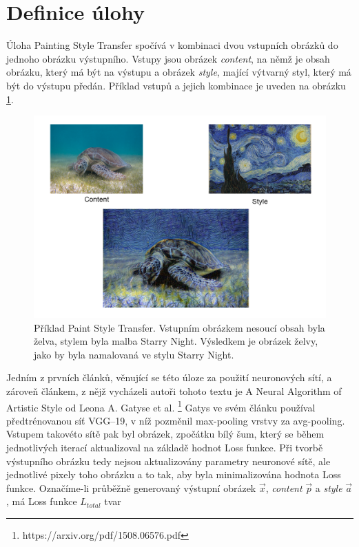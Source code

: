 \documentclass[twocolumn]{article}
\begin{document}
	\section*{Definice úlohy}
	Úloha Painting Style Transfer spočívá v kombinaci dvou vstupních obrázků do jednoho obrázku výstupního. Vstupy jsou obrázek \textit{content}, na němž je obsah obrázku, který má být na výstupu a obrázek \textit{style}, mající výtvarný styl, který má být do výstupu předán. Příklad vstupů a jejich kombinace je uveden na obrázku \ref{fig1}.
	\begin{figure}[ht]
	\includegraphics[width=\linewidth]{Ex_cropped.png}
	\caption{Příklad Paint Style Transfer. Vstupním obrázkem nesoucí obsah byla želva, stylem byla malba Starry Night. Výsledkem je obrázek želvy, jako by byla namalovaná ve stylu Starry Night.}
	\label{fig1}
	\end{figure}
	\par
	Jedním z prvních článků, věnující se této úloze za použití neuronových sítí, a zároveň článkem, z nějž vycházeli autoři tohoto textu je A Neural Algorithm of Artistic Style od Leona A. Gatyse et al. \footnote{https://arxiv.org/pdf/1508.06576.pdf} Gatys ve svém článku používal předtrénovanou síť VGG--19, v níž pozměnil max-pooling vrstvy za avg-pooling. Vstupem takovéto sítě pak byl obrázek, zpočátku bílý šum, který se během jednotlivých iterací aktualizoval na základě hodnot Loss funkce. Při tvorbě výstupního obrázku tedy nejsou aktualizovány parametry neuronové sítě, ale jednotlivé pixely toho obrázku a to tak, aby byla minimalizována hodnota Loss funkce. Označíme-li průběžně generovaný výstupní obrázek $\overrightarrow{x}$, \textit{content}  $\overrightarrow{p}$ a \textit{style}  $\overrightarrow{a}$, má Loss funkce $L_{total}$ tvar
\end{document}
